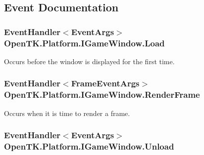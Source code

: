 \subsection{Event Documentation}
\hypertarget{interface_open_t_k_1_1_platform_1_1_i_game_window_a59759b2288998cda597bcd28f72994da}{
\subsubsection[{Load}]{\setlength{\rightskip}{0pt plus 5cm}Event\-Handler$<$Event\-Args$>$ Open\-T\-K.\-Platform.\-I\-Game\-Window.\-Load}}\label{interface_open_t_k_1_1_platform_1_1_i_game_window_a59759b2288998cda597bcd28f72994da}


Occurs before the window is displayed for the first time. 

\hypertarget{interface_open_t_k_1_1_platform_1_1_i_game_window_a93a6ae6565e74397cb44c57e99f55867}{
\subsubsection[{Render\-Frame}]{\setlength{\rightskip}{0pt plus 5cm}Event\-Handler$<${\bf Frame\-Event\-Args}$>$ Open\-T\-K.\-Platform.\-I\-Game\-Window.\-Render\-Frame}}\label{interface_open_t_k_1_1_platform_1_1_i_game_window_a93a6ae6565e74397cb44c57e99f55867}


Occurs when it is time to render a frame. 

\hypertarget{interface_open_t_k_1_1_platform_1_1_i_game_window_a493b559f07695d05b9a62a4fb7f8addb}{
\subsubsection[{Unload}]{\setlength{\rightskip}{0pt plus 5cm}Event\-Handler$<$Event\-Args$>$ Open\-T\-K.\-Platform.\-I\-Game\-Window.\-Unload}}\label{interface_open_t_k_1_1_platform_1_1_i_game_window_a493b559f07695d05b9a62a4fb7f8addb}


